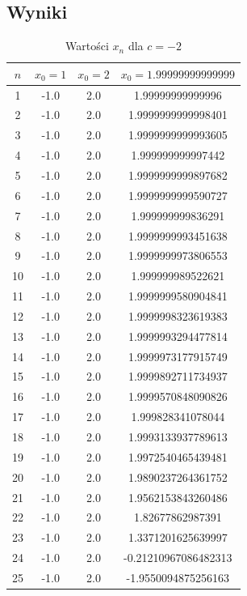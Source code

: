 \documentclass[10pt,a4paper, polish]{article}
\begin{document}
\subsection*{Wyniki}
\begin{table}[H]
\centering
\caption{Wartości $x_n$ dla $c = -2$}
\begin{tabular}{|c|c|c|c|}
\hline
$n$ & $x_0=1$ & $x_0=2$ & $x_0=1.99999999999999$ \\
\hline
1 & -1.0 & 2.0 & 1.99999999999996 \\
\hline
2 & -1.0 & 2.0 & 1.9999999999998401 \\
\hline
3 & -1.0 & 2.0 & 1.9999999999993605 \\
\hline
4 & -1.0 & 2.0 & 1.999999999997442 \\
\hline
5 & -1.0 & 2.0 & 1.9999999999897682 \\
\hline
6 & -1.0 & 2.0 & 1.9999999999590727 \\
\hline
7 & -1.0 & 2.0 & 1.999999999836291 \\
\hline
8 & -1.0 & 2.0 & 1.9999999993451638 \\
\hline
9 & -1.0 & 2.0 & 1.9999999973806553 \\
\hline
10 & -1.0 & 2.0 & 1.999999989522621 \\
\hline
11 & -1.0 & 2.0 & 1.9999999580904841 \\
\hline
12 & -1.0 & 2.0 & 1.9999998323619383 \\
\hline
13 & -1.0 & 2.0 & 1.9999993294477814 \\
\hline
14 & -1.0 & 2.0 & 1.9999973177915749 \\
\hline
15 & -1.0 & 2.0 & 1.9999892711734937 \\
\hline
16 & -1.0 & 2.0 & 1.9999570848090826 \\
\hline
17 & -1.0 & 2.0 & 1.999828341078044 \\
\hline
18 & -1.0 & 2.0 & 1.9993133937789613 \\
\hline
19 & -1.0 & 2.0 & 1.9972540465439481 \\
\hline
20 & -1.0 & 2.0 & 1.9890237264361752 \\
\hline
21 & -1.0 & 2.0 & 1.9562153843260486 \\
\hline
22 & -1.0 & 2.0 & 1.82677862987391 \\
\hline
23 & -1.0 & 2.0 & 1.3371201625639997 \\
\hline
24 & -1.0 & 2.0 & -0.21210967086482313 \\
\hline
25 & -1.0 & 2.0 & -1.9550094875256163 \\

\end{tabular}
\end{table}
\end{document}
